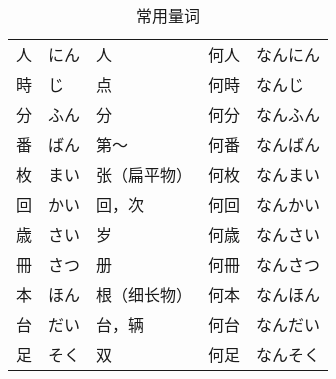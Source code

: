 \begin{table}[h]
  \centering
  \caption{常用量词}
  \label{tab:number}
  \small
  \begin{tabular}{lll | ll}
    人 & にん & 人           & 何人 & なんにん  \\
    時 & じ   & 点           & 何時 & なんじ    \\
    分 & ふん & 分           & 何分 & なんふん  \\
    番 & ばん & 第～         & 何番 & なんばん  \\
    枚 & まい & 张（扁平物） & 何枚 & なんまい  \\
    回 & かい & 回，次       & 何回 & なんかい  \\
    歳 & さい & 岁           & 何歳 & なんさい  \\
    冊 & さつ & 册           & 何冊 & なんさつ  \\
    本 & ほん & 根（细长物） & 何本 & なんほん  \\
    台 & だい & 台，辆       & 何台 & なんだい  \\
    足 & そく & 双           & 何足 & なんそく  \\
  \end{tabular}
\end{table}

